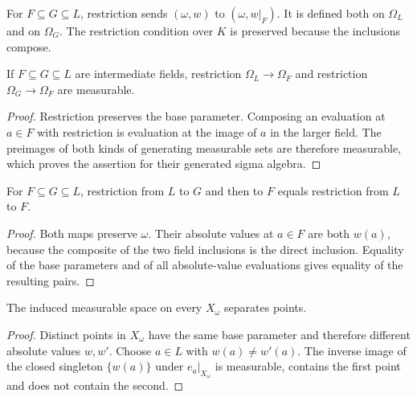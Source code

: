 \begin{definition}\label{def:restriction-parameters}
\leanok
{}
For $F\subseteq G\subseteq L$, restriction sends $(\omega,w)$ to
$(\omega,w|_F)$. It is defined both on $\Omega_L$ and on $\Omega_G$.
The restriction condition over $K$ is preserved because the inclusions compose.
\end{definition}

\begin{lemma}\label{lem:measurable-restriction}
\leanok
{}
If $F\subseteq G\subseteq L$ are intermediate fields, restriction
$\Omega_L\to\Omega_F$ and restriction $\Omega_G\to\Omega_F$ are measurable.
\end{lemma}
\begin{proof}
Restriction preserves the base parameter. Composing an evaluation at $a\in F$
with restriction is evaluation at the image of $a$ in the larger field.
The preimages of both kinds of generating measurable sets are therefore
measurable, which proves the assertion for their generated sigma algebra.
\end{proof}

\begin{lemma}\label{lem:restriction-transitive}
\leanok
{}
For $F\subseteq G\subseteq L$, restriction from $L$ to $G$ and then to $F$
equals restriction from $L$ to $F$.
\end{lemma}
\begin{proof}
Both maps preserve $\omega$. Their absolute values at $a\in F$ are both
$w(a)$, because the composite of the two field inclusions is the direct
inclusion. Equality of the base parameters and of all absolute-value
evaluations gives equality of the resulting pairs.
\end{proof}

\begin{lemma}\label{lem:fibre-separation}
\leanok
{}
The induced measurable space on every $X_\omega$ separates points.
\end{lemma}
\begin{proof}
Distinct points in $X_\omega$ have the same base parameter and therefore
different absolute values $w,w'$. Choose $a\in L$ with $w(a)\ne w'(a)$.
The inverse image of the closed singleton $\{w(a)\}$ under $e_a|_{X_\omega}$
is measurable, contains the first point and does not contain the second.
\end{proof}

